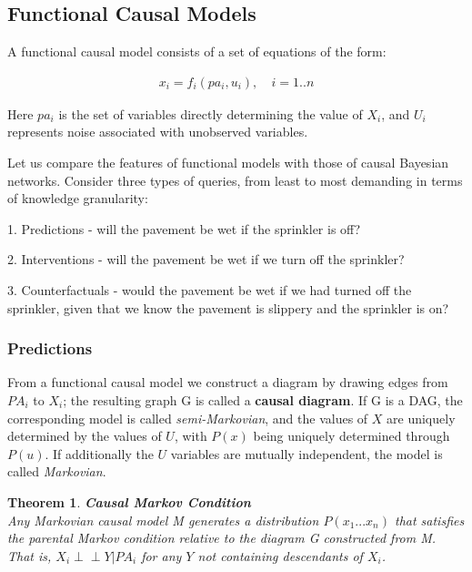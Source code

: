 \documentclass[fleqn]{article}
\newcommand{\independent}{\perp \!\!\! \perp}
\newtheorem{theorem}{Theorem}
\numberwithin{equation}{section}
\numberwithin{theorem}{section}
\numberwithin{figure}{section}
\numberwithin{lemma}{section}
\numberwithin{corollary}{section}
\begin{document}
\subsection*{Functional Causal Models}

A functional causal model consists of a set of equations of the form:

\begin{align}
	x_i = f_i(pa_i, u_i),& \  i=1..n
	\label{eq:causal_eq}
\end{align}

Here $pa_i$ is the set of variables directly determining the value of $X_i$, and $U_i$ represents noise associated with unobserved variables.

Let us compare the features of functional models with those of causal Bayesian networks. Consider three types of queries, from least to most demanding in terms of knowledge granularity:

1. Predictions - will the pavement be wet if the sprinkler is off?

2. Interventions - will the pavement be wet if we turn off the sprinkler?

3. Counterfactuals - would the pavement be wet if we had turned off the sprinkler, given that we know the pavement is slippery and the sprinkler is on?

\subsubsection*{Predictions}

From a functional causal model we construct a diagram by drawing edges from $PA_i$ to $X_i$; the resulting graph G is called a \textbf{causal diagram}. If G is a DAG, the corresponding model is called \textit{semi-Markovian}, and the values of $X$ are uniquely determined by the values of $U$, with $P(x)$ being uniquely determined through $P(u)$. If additionally the $U$ variables are mutually independent, the model is called \textit{Markovian}.

\begin{theorem}
	\textbf{Causal Markov Condition}\\
	Any Markovian causal model M generates a distribution $P(x_1...x_n)$ that satisfies the parental Markov condition relative to the diagram G constructed from M. That is, $X_i \independent Y | PA_i$ for any $Y$ not containing descendants of $X_i$.
	\label{th:causal_markov_condition}
\end{theorem}
\end{document}
